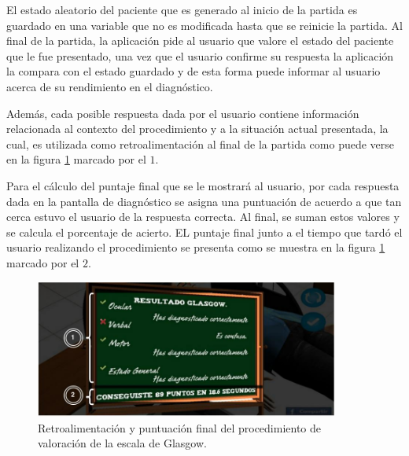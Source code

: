 \begin{itemize}

El estado aleatorio del paciente que es generado al inicio de la partida 
es guardado en una variable que no es modificada hasta que se reinicie la partida. 
Al final de la partida, la aplicación pide al usuario que valore el estado del paciente 
que le fue presentado, una vez que el usuario confirme su respuesta la aplicación la
compara con el estado guardado y de esta forma puede informar al usuario acerca
de su rendimiento en el diagnóstico. 

Además, cada posible respuesta dada por el usuario contiene información
relacionada al contexto del procedimiento y a la situación actual presentada, la
cual, es utilizada como retroalimentación al final de la partida como puede verse 
en la figura \ref{fig:glasgow_resultado} marcado por el $1$. 

Para el cálculo del puntaje final que se le mostrará al usuario, por cada respuesta 
dada en la pantalla de diagnóstico se asigna una puntuación de acuerdo a que tan 
cerca estuvo el usuario de la respuesta correcta. Al final, se suman estos 
valores y se calcula el porcentaje de acierto. EL puntaje final junto a el 
tiempo que tardó el usuario realizando el procedimiento se presenta como 
se muestra en la figura \ref{fig:glasgow_resultado} marcado por el $2$.

\begin{figure}[H]
\centering
\includegraphics[width=10cm]{solucion/images/glasgow_resultado.jpg}
\caption{Retroalimentación y puntuación final del procedimiento de valoración de 
la escala de Glasgow.}
\label{fig:glasgow_resultado}
\end{figure}

\end{itemize}

